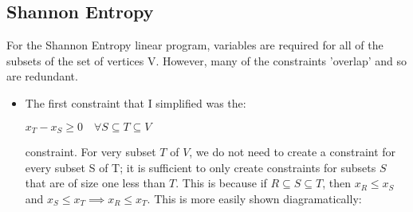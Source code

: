 \documentclass[a4paper]{article}
\begin{document}
\subsection{Shannon Entropy}
For the Shannon Entropy linear program, variables are required for all of the subsets of the set of vertices V. However, many of the constraints 'overlap' and so are redundant.
\begin{itemize}
\item The first constraint that I simplified was the:
\begin{center}
$x_T - x_S \geq 0 \quad \forall S \subseteq T \subseteq V$
\end {center}
constraint. For very subset $T$ of $V$, we do not need to create a constraint for every subset S of T; it is sufficient to only create constraints for subsets $S$ that are of size one less than $T$. This is because if $R \subseteq S \subseteq T$, then $x_R \leq x_S$ and $x_S \leq x_T \implies x_R \leq x_T$. This is more easily shown diagramatically:


\end{itemize}
\end{document}

